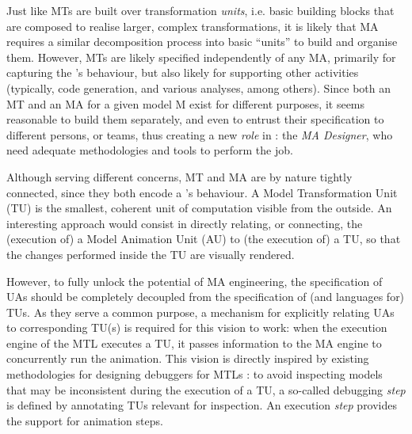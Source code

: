 Just like MTs are built over transformation \emph{units}, i.e. basic building blocks
that are composed to realise larger, complex transformations, it is likely that 
MA requires a similar decomposition process into basic ``units'' to build and 
organise them. However, MTs are likely specified independently of any MA, primarily
for capturing the \DSL's behaviour, but also likely for supporting other activities
(typically, code generation, and various analyses, among others). Since both an MT
and an MA for a given model \textsf{M} exist for different purposes, it seems 
reasonable to build them separately, and even to entrust their specification to
different persons, or teams, thus creating a new \emph{role} in \MDE: the 
\emph{MA Designer}, who need adequate methodologies and tools to perform the job.

Although serving different concerns, MT and MA are by nature tightly connected,
since they both encode a \DSL's behaviour. A Model Transformation Unit (TU) is the
smallest, coherent unit of computation visible from the outside. An interesting
approach would consist in directly relating, or connecting, the (execution of) a
Model Animation Unit (AU) to (the execution of) a TU, so that the changes performed
inside the TU are visually rendered. 

However, to fully unlock the potential of MA engineering, the specification of UAs
should be completely decoupled from the specification of (and languages for) TUs.
As they serve a common purpose, a mechanism for explicitly relating UAs to corresponding
TU(s) is required for this vision to work: when the execution engine of the MTL
executes a TU, it passes information to the MA engine to concurrently run the
animation. This vision is directly inspired by existing methodologies for designing 
debuggers for MTLs \citep{bousse2018omniscient,J:VanMierlo-Vangheluwe-etAl:2020}:
to avoid inspecting models that may be inconsistent during the execution of a TU,
a so-called debugging \emph{step} is defined by annotating TUs relevant for inspection.
An execution \emph{step} provides the support for animation steps.

